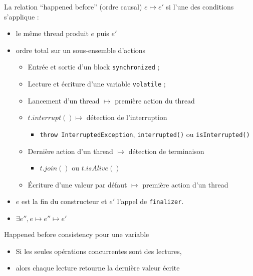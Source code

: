 \begin{frame}{La relation ``happened before'' (ordre causal)}
  $e\mapsto e'$ si l'une des conditions s'applique :    
  \begin{itemize}
  \item {} le même thread produit $e$ puis $e'$
  \item {} ordre total sur un sous-ensemble d'actions
  \begin{itemize}
    \item Entrée et sortie d'un block \lstinline{synchronized} ;
    \item Lecture et écriture d'une variable \lstinline{volatile} ;
    \item Lancement d'un thread $\mapsto$ première action du thread
    \item $t.interrupt() \mapsto$ détection de l'interruption 
      \begin{itemize}
      \item \lstinline{throw InterruptedException}, \lstinline{interrupted()} ou \lstinline{isInterrupted()}
      \end{itemize}
    \item Dernière action d'un thread $\mapsto$ détection de terminaison
      \begin{itemize}
      \item $t.join()$ ou $t.isAlive()$
      \end{itemize}
    \item Écriture d'une valeur par défaut $\mapsto$ première action d'un thread
  \end{itemize}
  \item {} $e$ est la fin du constructeur et $e'$ l'appel de \lstinline{finalizer}.
  \item {} $\exists e'', e\mapsto e'' \mapsto e'$
  \end{itemize}
  \begin{alertblock}{Happened before consistency pour une variable}
  \begin{itemize}
  \item \alert{Si les seules opérations concurrentes sont des lectures,}
  \item alors chaque lecture retourne la dernière valeur écrite
  \end{itemize}
  \end{alertblock}
\end{frame}

